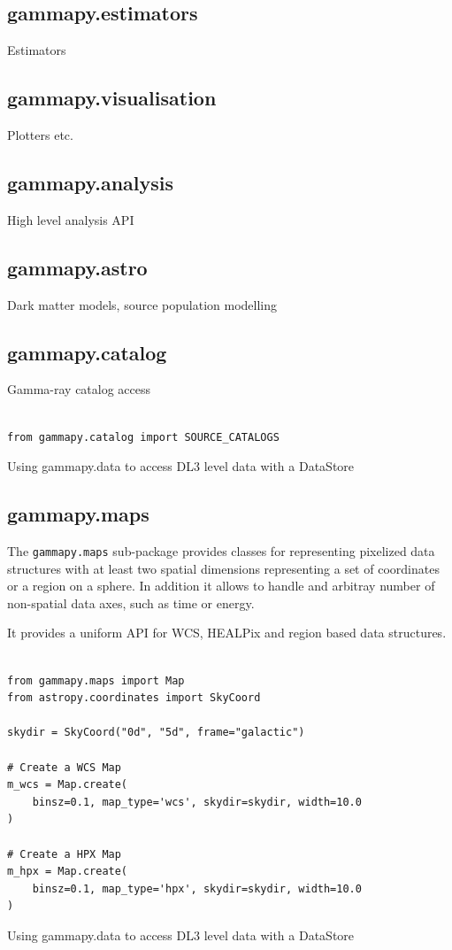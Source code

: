 \subsection{gammapy.estimators}
Estimators

\subsection{gammapy.visualisation}
Plotters etc.

\subsection{gammapy.analysis}
High level analysis API

\subsection{gammapy.astro}
Dark matter models, source population modelling


\subsection{gammapy.catalog}
Gamma-ray catalog access

\begin{listing}
\begin{verbatim}

from gammapy.catalog import SOURCE_CATALOGS

\end{verbatim}
\caption{Using gammapy.data to access DL3 level data with a DataStore}
\label{codeexample:data}
\end{listing}


\subsection{gammapy.maps}
The \verb|gammapy.maps| sub-package provides classes for representing pixelized
data structures with at least two spatial dimensions representing a set of
coordinates or a region on a sphere. In addition it allows to handle and arbitray
number of non-spatial data axes, such as time or energy.

It provides a uniform API for WCS, HEALPix and region based data structures.

\begin{listing}
\begin{verbatim}

from gammapy.maps import Map
from astropy.coordinates import SkyCoord

skydir = SkyCoord("0d", "5d", frame="galactic")

# Create a WCS Map
m_wcs = Map.create(
	binsz=0.1, map_type='wcs', skydir=skydir, width=10.0
)

# Create a HPX Map
m_hpx = Map.create(
	binsz=0.1, map_type='hpx', skydir=skydir, width=10.0
)

\end{verbatim}
\caption{Using gammapy.data to access DL3 level data with a DataStore}
\label{codeexample:data}
\end{listing}


